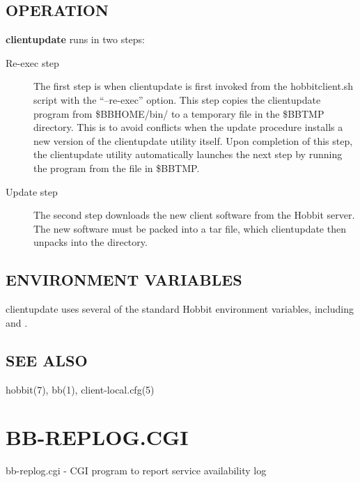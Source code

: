 \subsection{OPERATION}
\textbf{clientupdate}
 runs in two steps: 

 \begin{description}
\item[Re-exec step] The first step is when clientupdate is first invoked from the hobbitclient.sh script with the ``--re-exec'' option. This step copies the clientupdate program from \$BBHOME/bin/ to a temporary file in the \$BBTMP directory. This is to avoid conflicts when the update procedure installs a new version of the clientupdate utility itself. Upon completion of this step, the clientupdate utility automatically launches the next step by running the program from the file in \$BBTMP. 

 

\item[Update step] The second step downloads the new client software from the Hobbit server. The new software must be packed into a tar file, which clientupdate then unpacks into the  directory. 

 


\end{description}

\subsection{ENVIRONMENT VARIABLES}
 clientupdate uses several of the standard Hobbit environment variables, including 
 and 
. 

 
\subsection{SEE ALSO}
hobbit(7), bb(1), client-local.cfg(5) 



  
%
%



\newpage
\section{BB-REPLOG.CGI}

 bb-replog.cgi - CGI program to report service availability log 

